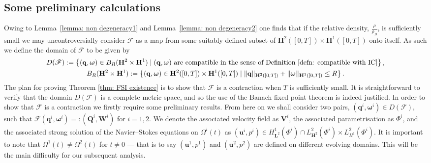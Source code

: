 \documentclass[a4paper]{amsart}
\numberwithin{equation}{section}
\theoremstyle{plain}
\newcommand{\mbf}[1]{\mathbf{#1}}
\begin{document}
\subsection{Some preliminary calculations}
\label{subsection: fixed point prelims}
Owing to Lemma~\ref{lemma: non degeneracy1} and Lemma~\ref{lemma: non degeneracy2} one finds that if the relative density, $\frac{\rho}{\rho_B}$, is sufficiently small we may uncontroversially consider $\mathscr{F}$ as a map from some suitably defined subset of $\mbf{H}^2([0,T]) \times \mbf{H}^1([0,T])$ onto itself.
As such we define the domain of $\mathscr{F}$ to be given by
\begin{gather*}
   D(\mathscr{F}) :=\left\{ (\mbf{q}, \boldsymbol{\omega}) \in B_R(\mbf{H}^2 \times \mbf{H}^1) \mid (\mbf{q}, \boldsymbol{\omega}) \text{ are compatible in the sense of Definition}~\ref{defn: compatible with IC}\right\},\\
   B_R(\mbf{H}^2 \times \mbf{H}^1) := \left\{(\mbf{q}, \boldsymbol{\omega}) \in \mbf{H}^2([0,T]) \times \mbf{H}^1([0,T]) \mid  \|\mbf{q}\|_{\mbf{H}^2([0,T])} + \|\boldsymbol{\omega}\|_{\mbf{H}^1([0,T])} \leq R \right\}.
\end{gather*}
The plan for proving Theorem \ref{thm: FSI existence} is to show that $\mathscr{F}$ is a contraction when $T$ is sufficiently small.
It is straightforward to verify that the domain $D(\mathscr{F})$ is a complete metric space, and so the use of the Banach fixed point theorem is indeed justified.
In order to show that $\mathscr{F}$ is a contraction we firstly require some preliminary results.
From here on we shall consider two pairs, $(\mbf{q}^i, \boldsymbol{\omega}^i) \in D(\mathscr{F})$, such that $\mathscr{F}(\mbf{q}^i, \boldsymbol{\omega}^i) =: (\mbf{Q}^i, \mbf{W}^i)$ for $i=1,2$.
We denote the associated velocity field as $\mbf{V}^i$, the associated parametrisation as $\Phi^i$, and the associated strong solution of the Navier--Stokes equations on $\Omega^i(t)$ as $(\mbf{u}^i, p^i) \in H^1_{\mbf{L}^2}(\Phi^i) \cap {L}^2_{\mbf{H}^2}(\Phi^i) \times L^2_{{H}^1}(\Phi^i)$.
It is important to note that $\Omega^1(t) \neq \Omega^2(t)$ for $t \neq 0$ --- that is to say $(\mbf{u}^1, p^1)$ and $(\mbf{u}^2, p^2)$ are defined on different evolving domains.
This will be the main difficulty for our subsequent analysis.
\end{document}
